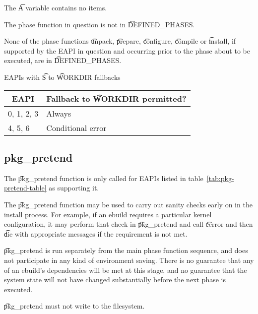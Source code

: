 \begin{compactitem}
\item The \t{A} variable contains no items.
\item The phase function in question is not in \t{DEFINED\_PHASES}.
\item None of the phase functions \t{unpack}, \t{prepare}, \t{configure}, \t{compile} or \t{install},
    if supported by the EAPI in question and occurring prior to the phase about to be executed, are
    in \t{DEFINED\_PHASES}.
\end{compactitem}

\begin{centertable}{EAPIs with \t{S} to \t{WORKDIR} fallbacks}
    \label{tab:s-fallback-table}
    \begin{tabular}{ll}
      \toprule
      \multicolumn{1}{c}{\textbf{EAPI}} &
      \multicolumn{1}{c}{\textbf{Fallback to \t{WORKDIR} permitted?}} \\
      \midrule
      0, 1, 2, 3        & Always            \\
      4, 5, 6           & Conditional error \\
      \bottomrule
    \end{tabular}
\end{centertable}

\subsection{pkg\_pretend}

 The \t{pkg\_pretend} function is only called for EAPIs listed in
table~\ref{tab:pkg-pretend-table} as supporting it.

The \t{pkg\_pretend} function may be used to carry out sanity checks early on in the install
process. For example, if an ebuild requires a particular kernel configuration, it may perform that
check in \t{pkg\_pretend} and call \t{eerror} and then \t{die} with appropriate messages if the
requirement is not met.

\t{pkg\_pretend} is run separately from the main phase function sequence, and does not participate
in any kind of environment saving. There is no guarantee that any of an ebuild's dependencies will
be met at this stage, and no guarantee that the system state will not have changed substantially
before the next phase is executed.

\t{pkg\_pretend} must not write to the filesystem.

